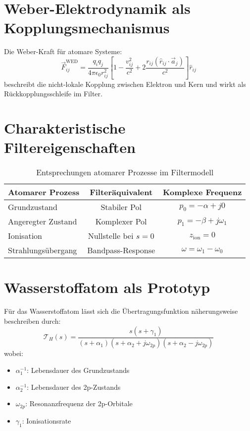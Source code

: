 \section{Weber-Elektrodynamik als Kopplungsmechanismus}

Die Weber-Kraft für atomare Systeme:
\[
\vec{F}_{ij}^{\text{WED}} = \frac{q_i q_j}{4\pi\epsilon_0 r_{ij}^2}\left[1 - \frac{v_{ij}^2}{c^2} + 2\frac{r_{ij}(\hat{r}_{ij}\cdot\vec{a}_j)}{c^2}\right]\hat{r}_{ij}
\]
beschreibt die nicht-lokale Kopplung zwischen Elektron und Kern und wirkt als Rückkopplungsschleife im Filter.

\section{Charakteristische Filtereigenschaften}

\begin{table}[ht]
\centering
\begin{tabular}{lcc}
\hline
Atomarer Prozess & Filteräquivalent & Komplexe Frequenz \\
\hline
Grundzustand & Stabiler Pol & $p_0 = -\alpha + j0$ \\
Angeregter Zustand & Komplexer Pol & $p_1 = -\beta + j\omega_1$ \\
Ionisation & Nullstelle bei $s = 0$ & $z_{\text{ion}} = 0$ \\
Strahlungsübergang & Bandpass-Response & $\omega = \omega_1 - \omega_0$ \\
\hline
\end{tabular}
\caption{Entsprechungen atomarer Prozesse im Filtermodell}
\end{table}

\section{Wasserstoffatom als Prototyp}

Für das Wasserstoffatom lässt sich die Übertragungsfunktion näherungsweise beschreiben durch:
\[
\mathcal{T}_H(s) = \frac{s(s + \gamma_1)}{(s + \alpha_1)(s + \alpha_2 + j\omega_{2p})(s + \alpha_2 - j\omega_{2p})}
\]
wobei:
\begin{itemize}
\item $\alpha_1^{-1}$: Lebensdauer des Grundzustands
\item $\alpha_2^{-1}$: Lebensdauer des 2p-Zustands
\item $\omega_{2p}$: Resonanzfrequenz der 2p-Orbitale
\item $\gamma_1$: Ionisationsrate
\end{itemize}

